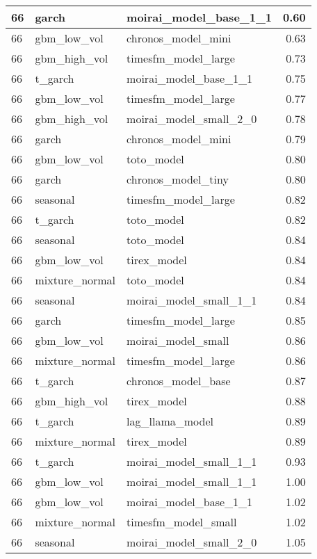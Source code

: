 {\begin{tabular}{lllr}
\midrule
66 & garch & moirai\_model\_base\_1\_1 & 0.60 \\
\midrule
66 & gbm\_low\_vol & chronos\_model\_mini & 0.63 \\
\midrule
66 & gbm\_high\_vol & timesfm\_model\_large & 0.73 \\
\midrule
66 & t\_garch & moirai\_model\_base\_1\_1 & 0.75 \\
\midrule
66 & gbm\_low\_vol & timesfm\_model\_large & 0.77 \\
\midrule
66 & gbm\_high\_vol & moirai\_model\_small\_2\_0 & 0.78 \\
\midrule
66 & garch & chronos\_model\_mini & 0.79 \\
\midrule
66 & gbm\_low\_vol & toto\_model & 0.80 \\
\midrule
66 & garch & chronos\_model\_tiny & 0.80 \\
\midrule
66 & seasonal & timesfm\_model\_large & 0.82 \\
\midrule
66 & t\_garch & toto\_model & 0.82 \\
\midrule
66 & seasonal & toto\_model & 0.84 \\
\midrule
66 & gbm\_low\_vol & tirex\_model & 0.84 \\
\midrule
66 & mixture\_normal & toto\_model & 0.84 \\
\midrule
66 & seasonal & moirai\_model\_small\_1\_1 & 0.84 \\
\midrule
66 & garch & timesfm\_model\_large & 0.85 \\
\midrule
66 & gbm\_low\_vol & moirai\_model\_small & 0.86 \\
\midrule
66 & mixture\_normal & timesfm\_model\_large & 0.86 \\
\midrule
66 & t\_garch & chronos\_model\_base & 0.87 \\
\midrule
66 & gbm\_high\_vol & tirex\_model & 0.88 \\
\midrule
66 & t\_garch & lag\_llama\_model & 0.89 \\
\midrule
66 & mixture\_normal & tirex\_model & 0.89 \\
\midrule
66 & t\_garch & moirai\_model\_small\_1\_1 & 0.93 \\
\midrule
66 & gbm\_low\_vol & moirai\_model\_small\_1\_1 & 1.00 \\
\midrule
66 & gbm\_low\_vol & moirai\_model\_base\_1\_1 & 1.02 \\
\midrule
66 & mixture\_normal & timesfm\_model\_small & 1.02 \\
\midrule
66 & seasonal & moirai\_model\_small\_2\_0 & 1.05 \\

\end{tabular}}
